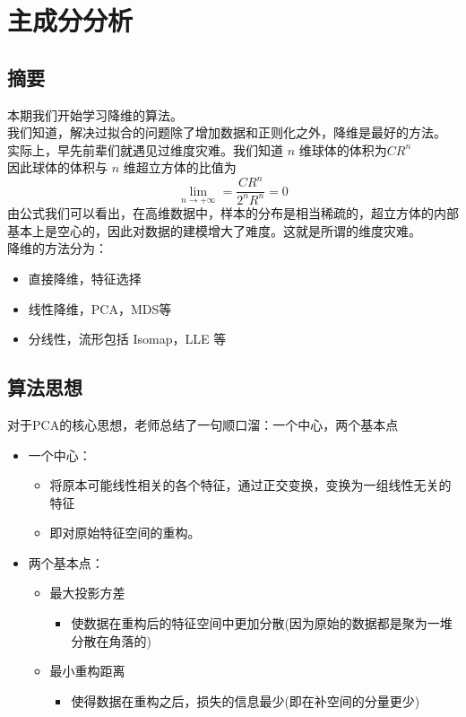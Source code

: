 \documentclass{report}
\begin{document}
\section{主成分分析}
\subsection{摘要}
本期我们开始学习降维的算法。\\
我们知道，解决过拟合的问题除了增加数据和正则化之外，降维是最好的方法。\\
实际上，早先前辈们就遇见过维度灾难。我们知道 $n$ 维球体的体积为$CR^n$\\
因此球体的体积与 $n$ 维超立方体的比值为
$$
\lim_{n \to +\infty}=\frac{CR^n}{2^n R^n}=0
$$
由公式我们可以看出，在高维数据中，样本的分布是相当稀疏的，超立方体的内部基本上是空心的，因此对数据的建模增大了难度。这就是所谓的维度灾难。\\
降维的方法分为：
\begin{itemize}
	\item 直接降维，特征选择
	\item 线性降维，PCA，MDS等
	\item 分线性，流形包括 Isomap，LLE 等
\end{itemize}
\subsection{算法思想}
对于PCA的核心思想，老师总结了一句顺口溜：一个中心，两个基本点
\begin{itemize}
	\item 一个中心：
	\begin{itemize}
	\item 将原本可能线性相关的各个特征，通过正交变换，变换为一组线性无关的特征
	\item 即对原始特征空间的重构。
	\end{itemize}
	\item 两个基本点：
	\begin{itemize}
	\item 最大投影方差
	\begin{itemize}
	\item 使数据在重构后的特征空间中更加分散(因为原始的数据都是聚为一堆分散在角落的)
	\end{itemize}
	\item 最小重构距离
	\begin{itemize}
	\item 使得数据在重构之后，损失的信息最少(即在补空间的分量更少)
	\end{itemize}
	\end{itemize}
\end{itemize}
\end{document}
